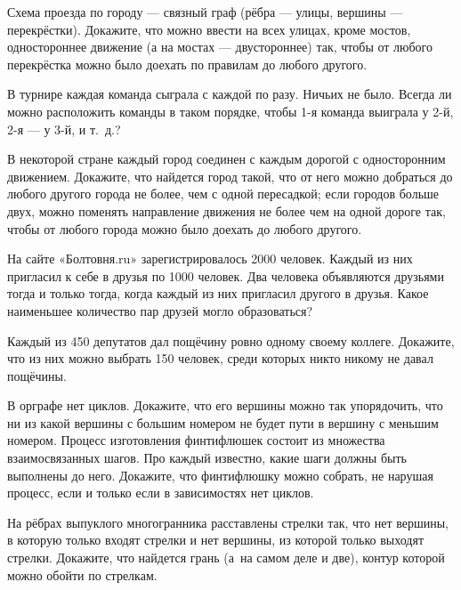 \documentclass[12pt,a4paper]{article}
\begin{document}
Схема проезда по городу --- связный граф (рёбра --- улицы,
вершины --- перекрёстки).
Докажите, что можно ввести на всех улицах, кроме мостов, одностороннее
движение (а на мостах --- двустороннее) так, чтобы от любого
перекрёстка можно было доехать по правилам до любого другого. %

В турнире каждая команда сыграла с каждой по разу.
Ничьих не было. Всегда ли можно расположить команды в таком
порядке, чтобы 1-я команда выиграла у 2-й,
2-я --- у 3-й, и т.~д.?

В некоторой стране каждый город соединен с каждым дорогой с односторонним движением. Докажите, что
 найдется город такой, что от него можно добраться до любого другого города не более, чем с одной пересадкой;
 если городов больше двух, можно поменять направление движения не более чем на одной дороге так, чтобы от любого города можно было доехать до любого другого.

На сайте «Болтовня.ru» зарегистрировалось 2000 человек. Каждый из них пригласил к себе в друзья по 1000 человек. Два человека объявляются друзьями тогда и только тогда, когда каждый из них пригласил другого в друзья. Какое наименьшее количество пар друзей могло образоваться?



Каждый из 450 депутатов дал пощёчину ровно одному своему
коллеге. Докажите, что из них можно выбрать 150
человек,  среди которых никто никому не давал пощёчины.


 В орграфе нет циклов. Докажите, что его вершины можно так упорядочить, что ни из какой вершины с большим номером не будет пути в вершину с меньшим номером.
Процесс изготовления финтифлюшек состоит из множества взаимосвязанных шагов. Про каждый известно, какие шаги должны быть выполнены до него. Докажите, что финтифлюшку можно собрать, не нарушая процесс, если и только если в зависимостях нет циклов.

На рёбрах выпуклого многогранника расставлены стрелки так, что нет вершины, в которую только входят стрелки и нет вершины, из которой только выходят стрелки. Докажите, что найдется грань (а~на самом деле и две), контур которой можно обойти по стрелкам.
\end{document}
